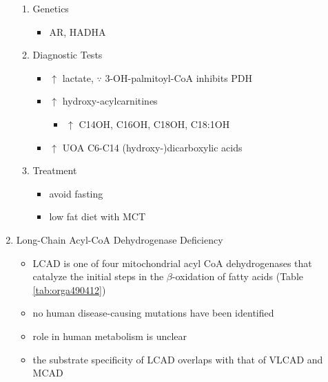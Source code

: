 \documentclass{scrartcl}
\begin{document}
\begin{enumerate}
\begin{enumerate}
\item Genetics
\label{sec:org177ea3a}
\begin{itemize}
\item AR, HADHA
\end{itemize}

\item Diagnostic Tests
\label{sec:org1bd9e00}
\begin{itemize}
\item \(\uparrow\) lactate, \(\because\) 3-OH-palmitoyl-CoA inhibits PDH
\item \(\uparrow\) hydroxy-acylcarnitines
\begin{itemize}
\item \(\uparrow\) C14OH, C16OH, C18OH, C18:1OH
\end{itemize}
\item \(\uparrow\) UOA C6-C14 (hydroxy-)dicarboxylic acids
\end{itemize}

\item Treatment
\label{sec:org0813546}
\begin{itemize}
\item avoid fasting
\item low fat diet with MCT
\end{itemize}
\end{enumerate}
\item Long-Chain Acyl-CoA Dehydrogenase Deficiency
\label{sec:org571671f}
\begin{itemize}
\item LCAD is one of four mitochondrial acyl CoA dehydrogenases that
catalyze the initial steps in the \(\beta\)-oxidation of fatty acids
(Table \ref{tab:orga490412})
\item no human disease-causing mutations have been identified
\item role  in  human  metabolism  is unclear
\item the substrate specificity of LCAD overlaps with that of
VLCAD and MCAD
\end{itemize}


\end{enumerate}
\end{document}
